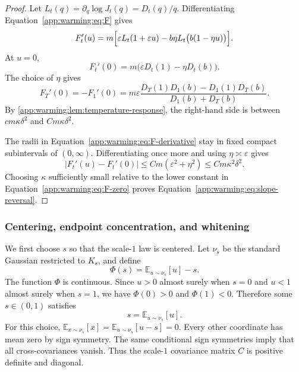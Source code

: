 \documentclass[11pt]{article}
\numberwithin{equation}{section}
\theoremstyle{definition}
\newcommand{\E}[2]{\mathbb{E}_{#1}\left[#2\right]}
\begin{document}
\begin{proof}
Let $L_t(q)=\partial_q\log J_t(q)=D_t(q)/q$.
Differentiating Equation~\eqref{app:warming:eq:F} gives
\begin{equation}
  F_t'(u)
  =m\Bigl[
    \varepsilon L_t(1+\varepsilon u)
    -b\eta L_t\bigl(b(1-\eta u)\bigr)
  \Bigr].
  \label{app:warming:eq:F-derivative}
\end{equation}
At $u=0$,
\[
  F_t'(0)=m\bigl(\varepsilon D_t(1)-\eta D_t(b)\bigr).
\]
The choice of $\eta$ gives
\begin{equation}
F_T'(0)
=-F_1'(0)
=m\varepsilon \frac{D_T(1)D_1(b)-D_1(1)D_T(b)}{D_1(b)+D_T(b)}.
\label{app:warming:eq:F-zero}
\end{equation}
By \cref{app:warming:lem:temperature-response}, the right-hand side is between
$cm\kappa\delta^2$ and
$Cm\kappa\delta^2$.

The radii in Equation~\eqref{app:warming:eq:F-derivative} stay in fixed compact
subintervals of $(0,\infty)$.
Differentiating once more and using $\eta\asymp\varepsilon$ gives
\begin{equation}
|F_t'(u)-F_t'(0)|
\leq Cm(\varepsilon^2+\eta^2)
\leq Cm\kappa^2\delta^2.
\label{app:warming:eq:F-variation}
\end{equation}
Choosing $\kappa$ sufficiently small relative to the lower constant in
Equation~\eqref{app:warming:eq:F-zero} proves
Equation~\eqref{app:warming:eq:slope-reversal}.
\end{proof}

\subsubsection{Centering, endpoint concentration, and whitening}
\label{app:warming:sec:whitening}

We first choose $s$ so that the
scale-$1$ law is centered.
Let $\nu_s$ be the standard Gaussian restricted to
$K_s$, and define
\[
  \Phi(s)=\E{u\sim\nu_s}{u}-s.
\]
The function $\Phi$ is continuous.
Since $u>0$ almost surely when
$s=0$ and
$u<1$ almost surely when
$s=1$, we have
$\Phi(0)>0$ and
$\Phi(1)<0$.
Therefore some $s\in(0,1)$ satisfies
\begin{equation}
  s=\E{u\sim\nu_s}{u}.
  \label{app:warming:eq:centering-s}
\end{equation}
For this choice, $\E{x\sim\nu_s}{x}=\E{u\sim\nu_s}{u-s}=0$.
Every other coordinate has mean zero by sign symmetry.
The same conditional sign symmetries imply that all cross-covariances vanish.
Thus the scale-$1$ covariance matrix
$C$ is positive definite and diagonal.
\end{document}
